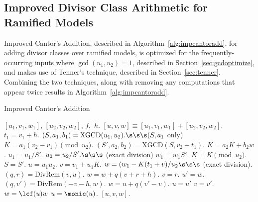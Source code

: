 \subsection{Improved Divisor Class Arithmetic for Ramified Models}\label{sec:ramimproved}
Improved Cantor's Addition, described in Algorithm~\ref{alg:impcantoradd}, for
adding divisor classes over ramified models, is optimized for the
frequently-occurring inputs where $\gcd(u_1 , u_2) = 1$, described in
Section~\ref{sec:gcdoptimize}, and makes use of Tenner's technique, described in
Section~\ref{sec:tenner}. Combining the two techniques, along with removing any
computations that appear twice results in Algorithm~\ref{alg:impcantoradd}.
\begin{algorithm}[htbp]
    \caption{Improved Cantor's Addition}
    \label{alg:impcantoradd}
    \begin{algorithmic}[1]
    \Require $[u_1,v_1,w_1]$, $[u_2,v_2,w_2]$, $f,$ $h.$
    \Ensure $[u,v,w] \equiv [u_1,v_1,w_1] + [u_2,v_2,w_2]$.
    \vspace{5pt}
    \State $t_1 = v_1 + h$.
    \State $(S,a_1,b_1) = \mathrm{XGCD}(u_1,u_2). \s\s\s  (S, a_1$ only)
    \State $K = a_1(v_2 - v_1) \pmod{u_2}.$
        \State $(S',a_2,b_2) = \mathrm{XGCD}(S,v_2 + t_1)$.
        \State $K = a_2K + b_2w$.
            \State $u_1 = u_1/S'$.
            \State $u_2 = u_2/S'. \s\s\s$ (exact division) 
            \State $w_1 = w_1S'$.
        \EndIf
        \State $K = K \pmod{u_2}$.
        \State $S = S'$.
    \EndIf
    \State $u = u_1u_2$.
    \State $v = v_1 + u_1K$.
    \State $w = (w_1 - K(t_1 + v)/u_2 \s\s\s$ (exact division).
            \State $(q,r) = \mathrm{DivRem}(v,u)$.
            \State $w = w + q(v + r + h)$.
            \State $v = r$.
        \EndIf
    \Else
            \State $u' = w$.
            \State $(q,v') = \mathrm{DivRem}(-v - h,w)$.
            \State $w = u + q(v' - v)$.
            \State $u = u'$
            \State $v = v'$.
        \EndWhile
        \State $w = \lcf(u)w$
        \State $u = \monic(u)$.
    \EndIf
    \State \Return $[u,v,w]$.
    \end{algorithmic}
    \end{algorithm}

